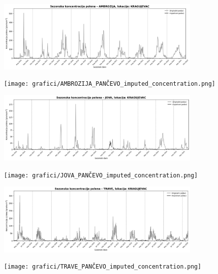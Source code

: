 \documentclass[12pt]{article}
\begin{document}
\begin{center}

\includegraphics[width=0.75\textwidth]{grafici/AMBROZIJA_KRAGUJEVAC_imputed_concentration.png}
\vspace{0.5cm}

\texttt{[image: grafici/AMBROZIJA\_PANČEVO\_imputed\_concentration.png]}
\vspace{0.5cm}

\includegraphics[width=0.75\textwidth]{grafici/JOVA_KRAGUJEVAC_imputed_concentration.png}
\vspace{0.5cm}

\texttt{[image: grafici/JOVA\_PANČEVO\_imputed\_concentration.png]}
\vspace{0.5cm}

\includegraphics[width=0.75\textwidth]{grafici/TRAVE_KRAGUJEVAC_imputed_concentration.png}
\vspace{0.5cm}

\texttt{[image: grafici/TRAVE\_PANČEVO\_imputed\_concentration.png]}
\vspace{0.5cm}

\label{fig:imputacija}

\end{center}
\end{document}
